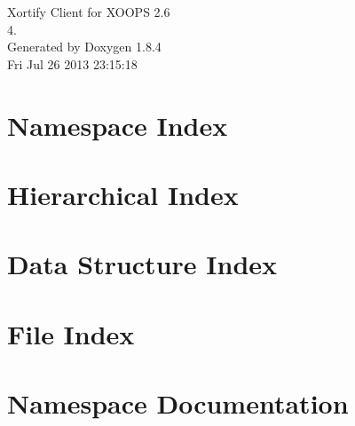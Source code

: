 \documentclass[twoside]{book}
\newcommand{\clearemptydoublepage}{%
  \newpage{\pagestyle{empty}\cleardoublepage}%
}
\begin{document}
\hypersetup{pageanchor=false}
\begin{titlepage}
\vspace*{7cm}
\begin{center}%
{\Large Xortify Client for X\-O\-O\-P\-S 2.6 \\[1ex]\large 4. }\\
\vspace*{1cm}
{\large Generated by Doxygen 1.8.4}\\
\vspace*{0.5cm}
{\small Fri Jul 26 2013 23:15:18}\\
\end{center}
\end{titlepage}
\clearemptydoublepage
\tableofcontents
\clearemptydoublepage
{}
\hypersetup{pageanchor=true}

\chapter{Namespace Index}

\chapter{Hierarchical Index}

\chapter{Data Structure Index}

\chapter{File Index}

\chapter{Namespace Documentation}





\end{document}

